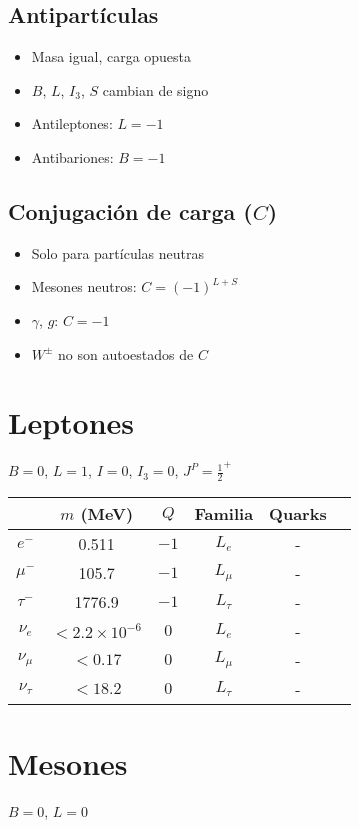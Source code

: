 \documentclass[10pt,twocolumn]{article}
\begin{document}
\subsection*{Antipartículas}
\begin{itemize}
  \item Masa igual, carga opuesta
  \item $B$, $L$, $I_3$, $S$ cambian de signo
  \item Antileptones: $L = -1$
  \item Antibariones: $B = -1$
\end{itemize}

\subsection*{Conjugación de carga ($C$)}
\begin{itemize}
  \item Solo para partículas neutras
  \item Mesones neutros: $C = (-1)^{L+S}$
  \item $\gamma$, $g$: $C = -1$
  \item $W^\pm$ no son autoestados de $C$
\end{itemize}
\newpage
\section*{Leptones}
$B = 0$, $L = 1$, $I = 0$, $I_3 = 0$, $J^P = \frac{1}{2}^+$

\begin{supertabular}{|c|c|c|c|c|c|}
\hline
 & $m$ (MeV) & $Q$ & Familia & Quarks \\
\hline
$e^-$ & 0.511 & $-1$ & $L_e$ & - \\
$\mu^-$ & 105.7 & $-1$ & $L_\mu$ & - \\
$\tau^-$ & 1776.9 & $-1$ & $L_\tau$ & - \\
$\nu_e$ & $<2.2 \times 10^{-6}$ & $0$ & $L_e$ & - \\
$\nu_\mu$ & $<0.17$ & $0$ & $L_\mu$ & - \\
$\nu_\tau$ & $<18.2$ & $0$ & $L_\tau$ & - \\
\hline
\end{supertabular}

\section*{Mesones}
$B = 0$, $L = 0$
\end{document}
